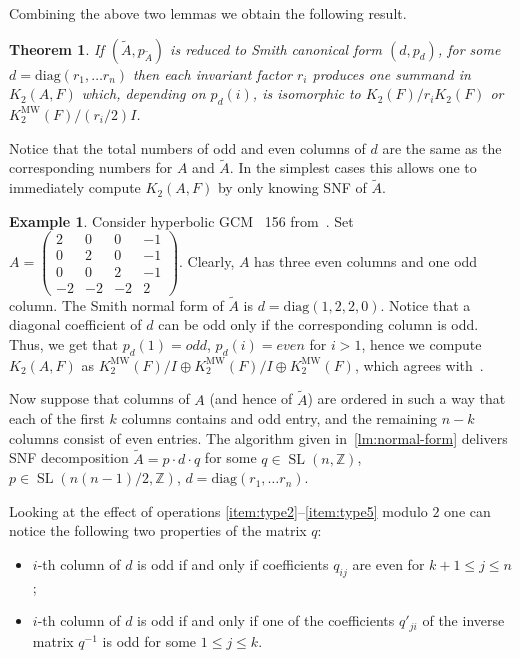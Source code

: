\documentclass[oneside, 10pt]{amsart}
\theoremstyle{plain}
\newtheorem{thm}{Theorem}
\theoremstyle{remark}
\theoremstyle{definition}
\newtheorem{example}{Example} \Crefname{example}{Example}{Examples}
\DeclareMathOperator{\SL}{SL}
\newcommand{\ZZ}{\mathbb{Z}}
\newcommand{\K}{K_2}
\newcommand{\Kmw}{K^{\mathrm{MW}}_2}
\begin{document}
Combining the above two lemmas we obtain the following result.
\begin{thm}
If $(\widetilde{A}, p_{\widetilde{A}})$ is reduced to Smith canonical form $(d, p_d)$, for some $d = \mathrm{diag}(r_1, \ldots r_n)$ then
 each invariant factor $r_i$ produces one summand in $\K(A, F)$ which, depending on $p_d(i)$, 
 is isomorphic to $\K(F)/r_i \K(F)$ or $\Kmw(F) / (r_i/2) I$.
\end{thm}

Notice that the total numbers of odd and even columns of $d$ are the same as the corresponding numbers for $A$ and $\widetilde{A}$.
In the simplest cases this allows one to immediately compute $\K(A, F)$ by only knowing SNF of $\widetilde{A}$.
\begin{example}
Consider hyperbolic GCM \textnumero~156 from~\cite[p.~19]{MW}.
 Set $A = \left(\begin{smallmatrix}
 2& 0& 0& -1\\
 0& 2& 0& -1\\
 0& 0& 2& -1\\
 -2& -2& -2& 2\end{smallmatrix}\right)$.
Clearly, $A$ has three even columns and one odd column. 
The Smith normal form of $\widetilde{A}$ is $d=\mathrm{diag}(1,2,2,0)$.
Notice that a diagonal coefficient of $d$ can be odd only if the corresponding column is odd.
Thus, we get that $p_d(1)=odd$, $p_d(i)=even$ for $i>1$, hence we compute $\K(A, F)$ as $\Kmw(F)/I \oplus \Kmw(F)/I \oplus \Kmw(F)$,
 which agrees with~\cite{MW}.
\end{example}
  
Now suppose that columns of $A$ (and hence of $\widetilde{A}$) are ordered in such a way that
 each of the first $k$ columns contains and odd entry, and the remaining $n-k$ columns consist of even entries.
The algorithm given in~\cref{lm:normal-form} delivers SNF decomposition
 $\widetilde{A} = p \cdot d \cdot q $ for some $q \in \SL(n, \ZZ)$, $p \in \SL(n(n-1)/2, \ZZ)$, $d = \mathrm{diag}(r_1, \ldots r_n)$.

Looking at the effect of operations \eqref{item:type2}--\eqref{item:type5} modulo $2$ one can notice the following two properties of the matrix $q$:
\begin{itemize}
 \item $i$-th column of $d$ is odd if and only if coefficients $q_{ij}$ are even for $k+1\leq j \leq n$;
 \item $i$-th column of $d$ is odd if and only if one of the coefficients $q'_{ji}$ of the inverse matrix $q^{-1}$ is odd for some $1\leq j\leq k$.
\end{itemize}
\end{document}
